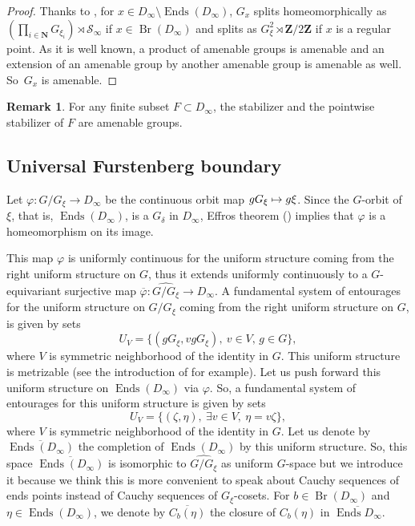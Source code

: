 \documentclass[JEP,XML,SOM,Unicode,NoFloatCountersInSection]{cedram}
\newcommand\mto{\mathchoice{\longmapsto}{\mapsto}{\mapsto}{\mapsto}}
\let\mathcal\mathscr
\theoremstyle{plain}
\theoremstyle{definition}
\newtheorem{rem}[thm]{Remark}
\newcommand{\NN}{\mathbf{N}}
\newcommand{\ZZ}{\mathbf{Z}}
\newcommand{\cS}{\mathcal{S}}
\newcommand{\sinf}{\cS_\infty}
\DeclareMathOperator{\Ends}{Ends}
\DeclareMathOperator{\Br}{Br}
\begin{document}
\begin{proof} Thanks to \cite[Lem.\,7.1]{DM_dendritesII}, for $x\in D_\infty\setminus\Ends(D_\infty)$, $G_x$ splits homeomorphically as $\left(\prod_{i\in\NN}G_{\xi_i}\right)\rtimes \sinf$ if $x\in\Br(D_\infty)$ and splits as $G_\xi^2\rtimes\ZZ/2\ZZ$ if $x$ is a regular point. As it is well known, a product of amenable groups is amenable and an extension of an amenable group by another amenable group is amenable as well. So~$G_x$ is amenable.
\end{proof}

\begin{rem} For any finite subset $F\subset D_\infty$, the stabilizer and the pointwise stabilizer of $F$ are amenable groups.\end{rem}

\subsection{Universal Furstenberg boundary}
Let $\varphi\colon G/G_\xi\to D_\infty$ be the continuous orbit map $gG_\xi\mto g\xi$. Since the $G$-orbit of $\xi$, that is, $\Ends(D_\infty)$, is a $G_\delta$ in $D_\infty$, Effros theorem (\cite[Th.\,7.12]{hjorth2000classification}) implies that $\varphi$ is a homeomorphism on its image.

This map $\varphi$ is uniformly continuous for the uniform structure coming from the right uniform structure on $G$, thus it extends uniformly continuously to a $G$-equivariant surjective map $\overline{\varphi}\colon\widehat{G/G_\xi}\to D_\infty$.
A fundamental system of entourages for the uniform structure on $G/G_\xi$ coming from the right uniform structure on $G$, is given by sets
\[
U_V=\{(gG_\xi,vgG_\xi),\ v\in V,\, g\in G\},
\]
where $V$ is symmetric neighborhood of the identity in $G$. This uniform structure is metrizable (see the introduction of \cite{melleray2015polish} for example). Let us push forward this uniform structure on $\Ends(D_\infty)$ via $\varphi$. So, a fundamental system of entourages for this uniform structure is given by sets
\[
U_V=\{(\zeta,\eta),\ \exists v\in V,\ \eta=v\zeta\},
\]
where $V$ is symmetric neighborhood of the identity in $G$. Let us denote by $\overline{\Ends(D_\infty)}$ the completion of $\Ends(D_\infty)$ by this uniform structure. So, this space $\overline{\Ends(D_\infty)}$ is isomorphic to $\widehat{G/G_\xi}$ as uniform $G$-space but we introduce it because we think this is more convenient to speak about Cauchy sequences of ends points instead of Cauchy sequences of $G_\xi$-cosets.
For $b\in\Br(D_\infty)$ and $\eta\in\Ends(D_\infty)$, we denote by $\overline{C_b(\eta)}$ the closure of $C_b(\eta)$ in $\overline{\Ends{D_\infty}}$.
\end{document}
